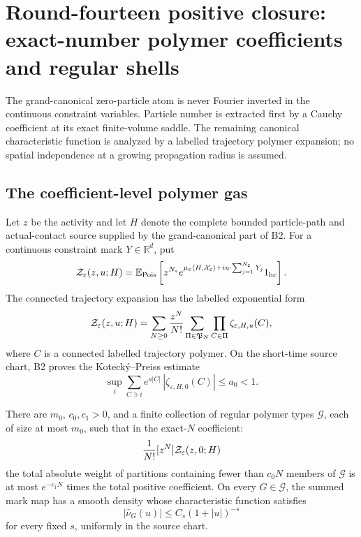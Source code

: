 
\section{Round-fourteen positive closure: exact-number polymer coefficients and regular shells}
\label{sec:r14-b1}

The grand-canonical zero-particle atom is never Fourier inverted in the
continuous constraint variables.  Particle number is extracted first by a
Cauchy coefficient at its exact finite-volume saddle.  The remaining
canonical characteristic function is analyzed by a labelled trajectory
polymer expansion; no spatial independence at a growing propagation radius
is assumed.

\subsection{The coefficient-level polymer gas}

Let \(z\) be the activity and let \(H\) denote the complete bounded
particle-path and actual-contact source supplied by the grand-canonical part
of B2.  For a continuous constraint mark
\(Y\in\mathbb R^d\), put
\[
 \mathcal Z_\varepsilon(z,u;H)
 =
 \mathbb E_{\rm Pois}
 \left[
 z^{N_\varepsilon}
 e^{\mu_\varepsilon\langle H,\mathcal X_\varepsilon\rangle
   +iu\cdot\sum_{j=1}^{N_\varepsilon}Y_j}
 1_{\rm hc}
 \right].
\]
The connected trajectory expansion has the labelled exponential form
\[
 \mathcal Z_\varepsilon(z,u;H)
 =
 \sum_{N\ge0}{z^N\over N!}
 \sum_{\Pi\in\mathfrak P_N}
 \prod_{C\in\Pi}\zeta_{\varepsilon,H,u}(C),
\]
where \(C\) is a connected labelled trajectory polymer.  On the short-time
source chart, B2 proves the Koteck\'y--Preiss estimate
\[
 \sup_i\sum_{C\ni i}
 e^{a|C|}\,|\zeta_{\varepsilon,H,0}(C)|
 \le a_0<1 .
\]

\begin{lemma}
\label{lem:r14-b1-components}
There are \(m_0\), \(c_0,c_1>0\), and a finite collection of regular polymer
types \(\mathcal G\), each of size at most \(m_0\), such that in the
exact-\(N\) coefficient:
\[
 {1\over N!}[z^N]\mathcal Z_\varepsilon(z,0;H)
\]
the total absolute weight of partitions containing fewer than \(c_0N\)
members of \(\mathcal G\) is at most \(e^{-c_1N}\) times the total positive
coefficient.  On every \(G\in\mathcal G\), the summed mark map has a smooth
density whose characteristic function satisfies
\[
 |\widehat\nu_G(u)|\le C_s(1+|u|)^{-s}
\]
for every fixed \(s\), uniformly in the source chart.
\end{lemma}

